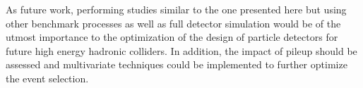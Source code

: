 As future work, performing studies similar to the one presented here but using other benchmark processes as well as full detector simulation would be of the utmost importance to the optimization of the design of particle detectors for future high energy hadronic colliders. In addition, the impact of pileup should be assessed and multivariate techniques could be implemented to further optimize the event selection. 

%

